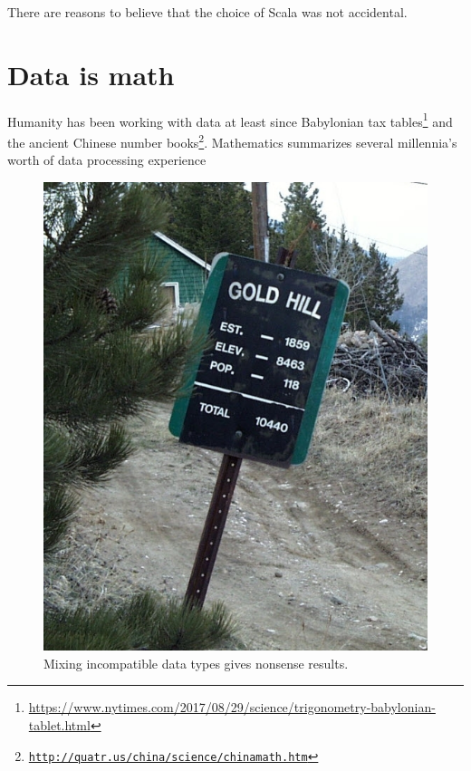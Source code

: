 There are reasons to believe that the choice of Scala was not accidental.

\section{Data is math}

Humanity has been working with data at least since Babylonian tax
tables\footnote{\href{https://www.nytimes.com/2017/08/29/science/trigonometry-babylonian-tablet.html}{https://www.nytimes.com/2017/08/29/science/trigonometry-babylonian-tablet.html}}
and the ancient Chinese number books\footnote{\texttt{\href{http://quatr.us/china/science/chinamath.htm}{http://quatr.us/china/science/chinamath.htm}}}.
Mathematics summarizes several millennia's worth of data processing
experience\begin{figure}%
\begin{centering}
\vspace{-0.4\baselineskip}
\includegraphics[width=1\linewidth]{type-error}\vspace{-0.5\baselineskip}
\par\end{centering}
\caption{Mixing incompatible data types gives nonsense results.\label{fig:A-nonsensical-calculation}}

\vspace{-6\baselineskip}
\end{figure}%
